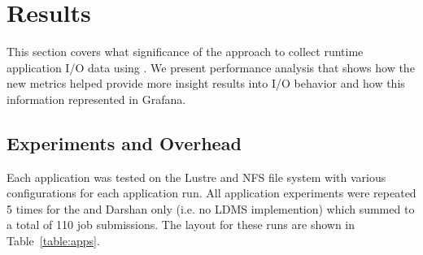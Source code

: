 \section{Results}
\label{sec:results}

This section covers what significance of the approach to collect
runtime application I/O data using \Darshan{}. We present performance
analysis that shows how the new metrics helped provide more insight
results into I/O behavior and how this information represented
in Grafana.

\subsection{Experiments and Overhead}
Each application was tested on the Lustre and NFS file system with various configurations for each application run. All application experiments were repeated 5 times for the \connector{} and Darshan only (i.e. no LDMS implemention) which summed to a total of 110 job submissions. The layout for these runs are shown in Table~\ref{table:apps}.  

